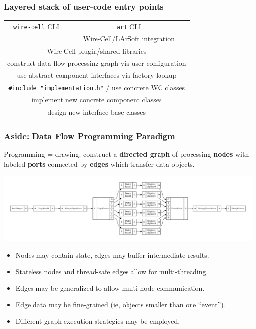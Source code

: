 \documentclass[xcolor=dvipsnames]{beamer}
\begin{document}
\begin{frame}
  \frametitle{Layered stack of user-code entry points}

  \begin{center}
    {\renewcommand{\arraystretch}{1.5}%
    \begin{tabular}[h]{|c|c|} \hline
      \texttt{wire-cell} CLI & \texttt{art} CLI \\
      & Wire-Cell/LArSoft integration \\
      \hline
      \hline
      \multicolumn{2}{|c|}{Wire-Cell plugin/shared libraries} \\
      \hline
      \hline
      \multicolumn{2}{|c|}{construct data flow processing graph via user configuration} \\
      \hline
      \multicolumn{2}{|c|}{use abstract component interfaces via factory lookup}\\
      \hline
      \multicolumn{2}{|c|}{\texttt{\#include "implementation.h"} / use concrete WC classes}\\
      \hline
      \multicolumn{2}{|c|}{implement new concrete component classes} \\
      \hline
      \multicolumn{2}{|c|}{design new interface base classes} \\
      \hline
    \end{tabular}}
  \end{center}
\end{frame}

\begin{frame}
  \frametitle{Aside: Data Flow Programming Paradigm}
  \footnotesize Programming = drawing: construct a \textbf{directed graph} of processing \textbf{nodes} with labeled \textbf{ports} connected by \textbf{edges} which transfer data objects.

  \includegraphics[width=\textwidth]{test-multiapa.pdf}
  
  \begin{itemize}\scriptsize
  \item Nodes may contain state, edges may buffer intermediate results.
  \item Stateless nodes and thread-safe edges allow for multi-threading.
  \item Edges may be generalized to allow multi-node communication. 
  \item Edge data may be fine-grained (ie, objects smaller than one ``event'').
  \item Different graph execution strategies may be employed.
  \end{itemize}

\end{frame}
\end{document}
